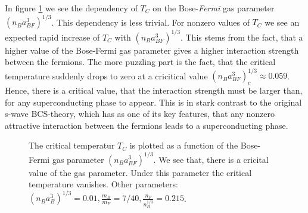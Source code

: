 In figure \ref{fig.TCrBF} we see the dependency of $T_C$ on the Bose-\textit{Fermi} gas parameter $(n_Ba_{BF}^3)^{1/3}$. This dependency is less trivial. For nonzero values of $T_C$ we see an expected rapid increase of $T_C$ with $(n_Ba_{BF}^3)^{1/3}$. This stems from the fact, that a higher value of the Bose-Fermi gas parameter gives a higher interaction strength between the fermions. The more puzzling part is the fact, that the critical temperature suddenly drops to zero at a cricitical value $(n_Ba_{BF}^3)_c^{1/3} \approx 0.059$. Hence, there is a critical value, that the interaction strength must be larger than, for any superconducting phase to appear. This is in stark contrast to the original s-wave BCS-theory, which has as one of its key features, that any nonzero attractive interaction between the fermions leads to a superconducting phase. 

\begin{figure} 
\begin{center}  
  
\caption{The critical temperatur $T_C$ is plotted as a function of the Bose-Fermi gas parameter $(n_Ba_{BF}^3)^{1/3}$. We see that, there is a cricital value of the gas parameter. Under this parameter the critical temperature vanishes. Other parameters: $(n_Ba_{B}^3)^{1/3} = 0.01, \frac{m_B}{m_F} = 7/40, \frac{n_F}{n_B^{1/3}} = 0.215$. }  
\label{fig.TCrBF}  
\end{center}    
\end{figure}



